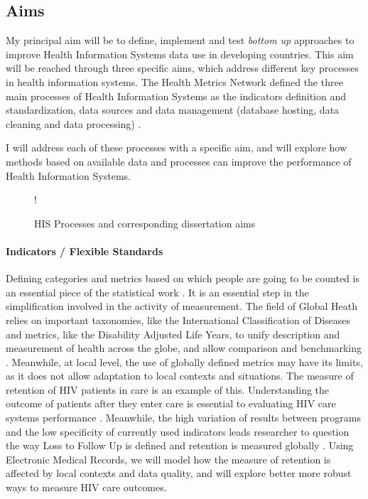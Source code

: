 \subsection{Aims}

My principal aim will be to define, implement and test \textit{bottom up} approaches to improve Health Information Systems data use in developing countries. This aim will be reached through three specific aims, which address different key processes in health information systems. The Health Metrics Network defined the three main processes of Health Information Systems as the indicators definition and standardization, data sources and data management (database hosting, data cleaning and data processing) \cite{health_metrics_network_framework_2008}.

I will address each of these processes with a specific aim, and will explore how methods based on available data and processes can improve the performance of Health Information Systems.

\begin{center}
 \begin {figure}[ht]
        \centering
\resizebox{\linewidth} {!} {

}
\caption{HIS Processes and corresponding dissertation aims}
\label{fig:process_aim}
\end{figure}
\end{center}


\paragraph{Indicators / Flexible Standards} Defining categories and metrics based on which people are going to be counted is an essential piece of the statistical work \cite{desrosieres_politique_1993}. It is an essential step in the simplification involved in the activity of measurement. The field of Global Heath relies on important taxonomies, like the International Classification of Diseases and metrics, like the Disability Adjusted Life Years, to unify description and measurement of health across the globe, and allow comparison and benchmarking \cite{murray_towards_2007,murray_health_2008}. Meanwhile, at local level, the use of globally defined metrics may have its limits, as it does not allow adaptation to local contexts and situations. The measure of retention of HIV patients in care is an example of this. Understanding the outcome of patients after they enter care is essential to evaluating HIV care systems performance \cite{the_global_fund_global_2014}. Meanwhile, the high variation of results between programs and the low specificity of currently used indicators leads researcher to question the way Loss to Follow Up is defined and retention is measured globally \cite{chi_universal_2011,yehia_comparing_2012,grimsrud_impact_2013,forster_electronic_2008}. Using Electronic Medical Records, we will model how the measure of retention is affected by local contexts and data quality, and will explore better more robust ways to measure HIV care outcomes.

